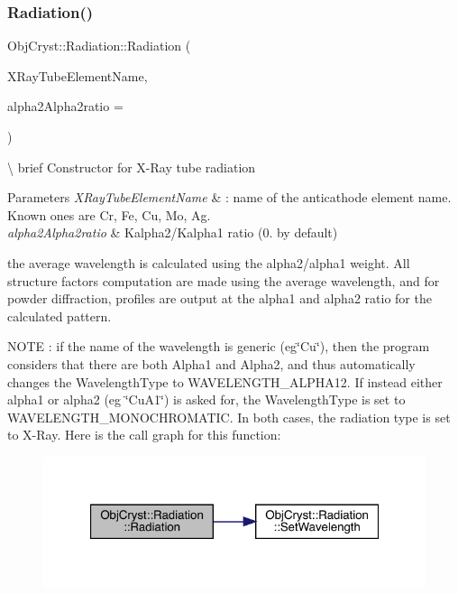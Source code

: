 \subsubsection{\texorpdfstring{Radiation()}{Radiation()}\hspace{0.1cm}{\footnotesize\ttfamily [2/2]}}
{\footnotesize\ttfamily Obj\+Cryst\+::\+Radiation\+::\+Radiation (\begin{DoxyParamCaption}\item[{const string \&}]{X\+Ray\+Tube\+Element\+Name,  }\item[{const R\+E\+AL}]{alpha2\+Alpha2ratio = {} }\end{DoxyParamCaption})}

\textbackslash{} brief Constructor for X-\/\+Ray tube radiation


\begin{DoxyParams}{Parameters}
{\em X\+Ray\+Tube\+Element\+Name} & \+: name of the anticathode element name. Known ones are Cr, Fe, Cu, Mo, Ag. \\
\hline
{\em alpha2\+Alpha2ratio} & Kalpha2/\+Kalpha1 ratio (0. by default)\\
\hline
\end{DoxyParams}
the average wavelength is calculated using the alpha2/alpha1 weight. All structure factors computation are made using the average wavelength, and for powder diffraction, profiles are output at the alpha1 and alpha2 ratio for the calculated pattern.

N\+O\+TE \+: if the name of the wavelength is generic (eg\char`\"{}\+Cu\char`\"{}), then the program considers that there are both Alpha1 and Alpha2, and thus automatically changes the Wavelength\+Type to W\+A\+V\+E\+L\+E\+N\+G\+T\+H\+\_\+\+A\+L\+P\+H\+A12. If instead either alpha1 or alpha2 (eg \char`\"{}\+Cu\+A1\char`\"{}) is asked for, the Wavelength\+Type is set to W\+A\+V\+E\+L\+E\+N\+G\+T\+H\+\_\+\+M\+O\+N\+O\+C\+H\+R\+O\+M\+A\+T\+IC. In both cases, the radiation type is set to X-\/\+Ray. Here is the call graph for this function\+:
\nopagebreak
\begin{figure}[H]
\begin{center}
\leavevmode
\includegraphics[width=321pt]{class_obj_cryst_1_1_radiation_a0302f8a0f706db01d0ada609c2e427d4_cgraph}
\end{center}
\end{figure}


